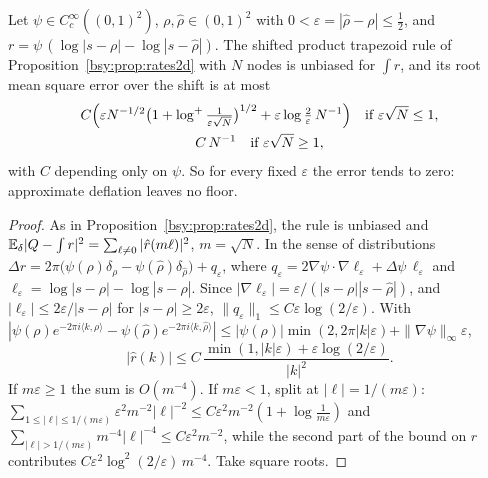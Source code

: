 \begin{proposition}\label{bsy:prop:defl}
Let $\psi\in C_c^\infty((0,1)^2)$, $\rho,\hat\rho\in(0,1)^2$ with $0<\varepsilon=|\hat\rho-\rho|\le\frac12$, and $r=\psi\,(\log|s-\rho|-\log|s-\hat\rho|)$. The shifted product trapezoid rule of Proposition~\ref{bsy:prop:rates2d} with $N$ nodes is unbiased for $\int r$, and its root mean square error over the shift is at most
\begin{gather*}
C\Bigl(\varepsilon N^{-1/2}\bigl(1+\log^+\tfrac1{\varepsilon\sqrt N}\bigr)^{1/2}+\varepsilon\log\tfrac2\varepsilon\,N^{-1}\Bigr)\quad\text{if }\varepsilon\sqrt N\le1,\\
C\,N^{-1}\quad\text{if }\varepsilon\sqrt N\ge1,
\end{gather*}
with $C$ depending only on $\psi$. So for every fixed $\varepsilon$ the error tends to zero: approximate deflation leaves no floor.
\end{proposition}

\begin{proof}
As in Proposition~\ref{bsy:prop:rates2d}, the rule is unbiased and $\mathbb{E}_\delta|Q-\int r|^2=\sum_{\ell\ne0}|\hat r(m\ell)|^2$, $m=\sqrt N$. In the sense of distributions $\Delta r=2\pi\bigl(\psi(\rho)\delta_\rho-\psi(\hat\rho)\delta_{\hat\rho}\bigr)+q_\varepsilon$, where $q_\varepsilon=2\nabla\psi\cdot\nabla\ell_\varepsilon+\Delta\psi\,\ell_\varepsilon$ and $\ell_\varepsilon=\log|s-\rho|-\log|s-\hat\rho|$. Since $|\nabla\ell_\varepsilon|=\varepsilon/(|s-\rho||s-\hat\rho|)$, and $|\ell_\varepsilon|\le2\varepsilon/|s-\rho|$ for $|s-\rho|\ge2\varepsilon$, $\|q_\varepsilon\|_1\le C\varepsilon\log(2/\varepsilon)$. With $|\psi(\rho)e^{-2\pi i\langle k,\rho\rangle}-\psi(\hat\rho)e^{-2\pi i\langle k,\hat\rho\rangle}|\le|\psi(\rho)|\min(2,2\pi|k|\varepsilon)+\|\nabla\psi\|_\infty\varepsilon$,
\[
|\hat r(k)|\le C\,\frac{\min(1,|k|\varepsilon)+\varepsilon\log(2/\varepsilon)}{|k|^2}.
\]
If $m\varepsilon\ge1$ the sum is $O(m^{-4})$. If $m\varepsilon<1$, split at $|\ell|=1/(m\varepsilon)$: $\sum_{1\le|\ell|\le1/(m\varepsilon)}\varepsilon^2m^{-2}|\ell|^{-2}\le C\varepsilon^2m^{-2}(1+\log\frac1{m\varepsilon})$ and $\sum_{|\ell|>1/(m\varepsilon)}m^{-4}|\ell|^{-4}\le C\varepsilon^2m^{-2}$, while the second part of the bound on $\hat r$ contributes $C\varepsilon^2\log^2(2/\varepsilon)\,m^{-4}$. Take square roots.
\end{proof}

